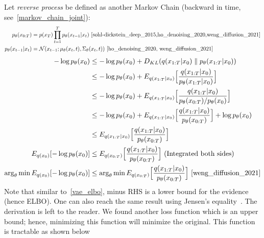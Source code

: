 \documentclass{book}
\numberwithin{equation}{subsection}
\begin{document}
Let \textit{reverse process} be defined as another Markov Chain (backward in time, see~\ref{markov_chain_joint}):
\begin{align}
    p_\theta(x_{0:T}) &= p(x_T)\prod_{t=1}^T p_\theta(x_{t-1}|x_t)~\cite{sohl-dickstein_deep_2015,ho_denoising_2020,weng_diffusion_2021}\\
    p_\theta(x_{t-1}|x_t) &= \mathcal{N}(x_{t-1}; \mu_\theta(x_t, t), \Sigma_\theta(x_t,t))~\cite{ho_denoising_2020, weng_diffusion_2021}
\end{align}
\begin{align}
-\log p_\theta(x_0)
&\leq -\log p_\theta(x_0)+D_{KL}(q(x_{1:T}|x_0) \parallel p_\theta(x_{1:T}|x_0))\\
&\leq -\log p_\theta(x_0)+E_{q(x_{1:T}|x_0)}\Big[\frac{q(x_{1:T}|x_0)}{p_\theta(x_{1:T}|x_0)}\Big]\\
&\leq -\log p_\theta(x_0)+E_{q(x_{1:T}|x_0)}\Big[\frac{q(x_{1:T}|x_0)}{p_\theta(x_{0:T})/p_\theta(x_0)}\Big]\\
&\leq -\log p_\theta(x_0)+E_{q(x_{1:T}|x_0)}\Big[\frac{q(x_{1:T}|x_0)}{p_\theta(x_{0:T})}\Big]+\log p_\theta(x_0)\\
&\leq E_{q(x_{1:T}|x_0)}\Big[\frac{q(x_{1:T}|x_0)}{p_\theta(x_{0:T})}\Big]\\
E_{q(x_0)}[-\log p_\theta(x_0)] &\leq E_{q(x_{0:T})}\Big[\frac{q(x_{1:T}|x_0)}{p_\theta(x_{0:T})}\Big]\ \text{(Integrated both sides)}\\
\arg_\theta \min E_{q(x_0)}[-\log p_\theta(x_0)] &\leq \arg_\theta \min E_{q(x_{0:T})}\Big[\frac{q(x_{1:T}|x_0)}{p_\theta(x_{0:T})}\Big]~\cite{weng_diffusion_2021}
\end{align}
Note that similar to~\ref{vae_elbo}, minus RHS is a lower bound for the evidence (hence ELBO). One can also reach the same result using Jensen's equality~\cite{sohl-dickstein_deep_2015,weng_diffusion_2021}. The derivation is left to the reader. We found another loss function which is an upper bound; hence, minimizing this function will minimize the original. This function is tractable as shown below
\end{document}
